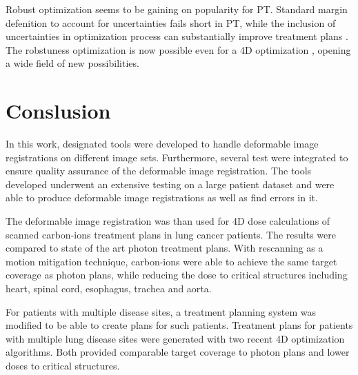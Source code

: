 \documentclass[type=dr, dr=rernat, accentcolor=tud7b,colorbacktitle, bigchapter, openright, twoside, 12pt ]{tudthesis}
\begin{document}
Robust optimization seems to be gaining on popularity for PT. Standard margin defenition to account for uncertainties fails short in PT, while the inclusion of uncertainties in 
optimization process can substantially improve treatment plans \cite{Chen2012}. The robstuness optimization is now possible even for a 4D optimization \cite{Liu2016}, opening a wide
field of new possibilities. 
\newpage

\chapter{Conslusion}

In this work, designated tools were developed to handle deformable image registrations on different image sets. Furthermore, several test were 
integrated to ensure quality assurance of the deformable image registration. The tools developed underwent an extensive testing on a large patient dataset
and were able to produce deformable image registrations as well as find errors in it.

The deformable image registration was than used for 4D dose calculations of scanned carbon-ions treatment plans in lung cancer patients. The results were compared
to state of the art photon treatment plans. With rescanning as a motion mitigation technique, carbon-ions were able to achieve the same target coverage as
photon plans, while reducing the dose to critical structures including heart, spinal cord, esophagus, trachea and aorta.

For patients with multiple disease sites, a treatment planning system was modified to be able to create plans for such patients. 
Treatment plans for patients with multiple lung disease sites were generated with two recent 4D optimization algorithms. Both provided
comparable target coverage to photon plans and lower doses to critical structures.
% 
% 
% 
% 
% 
% 
% 
% 
% 
% 
% 
% 
% 
% 
% 
% 


{}
% 
\end{document}
